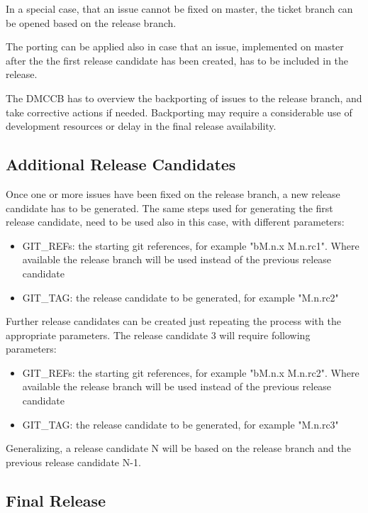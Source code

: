 In a special case, that an issue cannot be fixed on master, the ticket branch can be opened based on the release branch.

The porting can be applied also in case that an issue, implemented on master after the the first release candidate has been created, has to be included in the release.

The DMCCB has to overview the backporting of issues to the release branch, and take corrective actions if needed. Backporting may require a considerable use of development resources or delay in the final release availability.


\subsection{Additional Release Candidates} \label{sec:newrc}

Once one or more issues have been fixed on the release branch, a new release candidate has to be generated. %
The same steps used for generating the first release candidate, need to be used also in this case, with different parameters:

\begin{itemize}
\item GIT\_REFs: the starting git references, for example "bM.n.x M.n.rc1". Where available the release branch will be used instead of the previous release candidate
\item GIT\_TAG: the release candidate to be generated, for example "M.n.rc2"
\end{itemize}

Further release candidates can be created just repeating the process with the appropriate parameters.
The release candidate 3 will require following parameters:

\begin{itemize}
\item GIT\_REFs: the starting git references, for example "bM.n.x M.n.rc2". Where available the release branch will be used instead of the previous release candidate
\item GIT\_TAG: the release candidate to be generated, for example "M.n.rc3"
\end{itemize}

Generalizing, a release candidate N will be based on the release branch and the previous release candidate N-1.
 

\subsection{Final Release} \label{sec:finalrelease}

